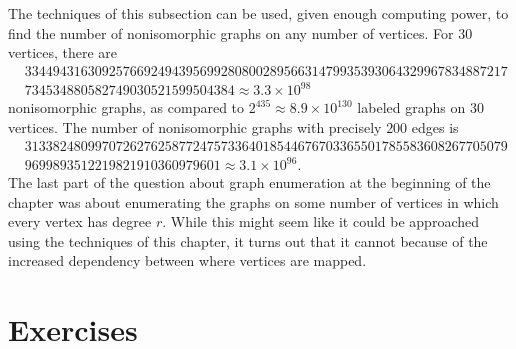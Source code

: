 The techniques of this subsection can be used, given enough computing
power, to find the number of nonisomorphic graphs on any number of
vertices. For $30$ vertices, there are 
\begin{align*}
  &334494316309257669249439569928080028956631479935393064329967834887217\\
  &734534880582749030521599504384\approx 3.3\times 10^{98}
\end{align*}
nonisomorphic graphs, as compared to $2^{435}\approx 8.9\times
10^{130}$ labeled graphs on $30$ vertices. The number of nonisomorphic
graphs with precisely $200$ edges is
\begin{align*}
  &313382480997072627625877247573364018544676703365501785583608267705079\\
  &9699893512219821910360979601\approx 3.1\times 10^{96}.
\end{align*}
The last part of the question about graph enumeration at the beginning
of the chapter was about enumerating the graphs on some number of
vertices in which every vertex has degree $r$. While this might seem
like it could be approached using the techniques of this chapter, it
turns out that it cannot because of the increased dependency between
where vertices are mapped.

\section{Exercises}\label{s:polya:ex}

